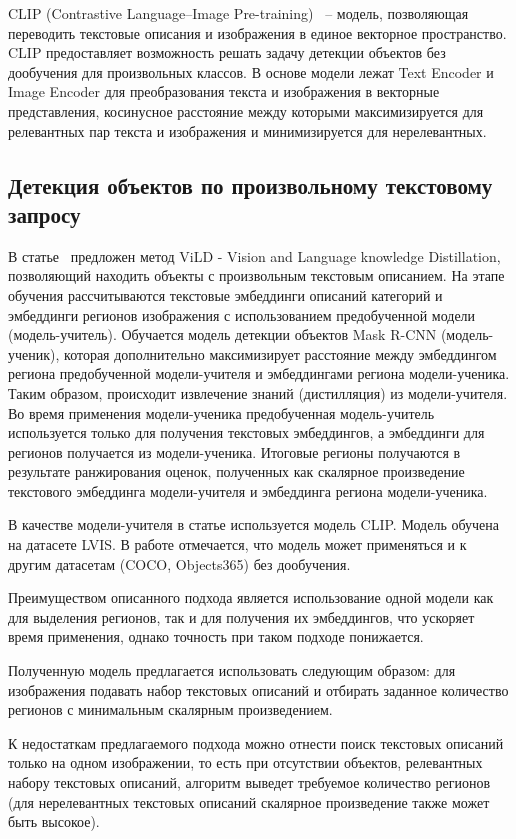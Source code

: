 \documentclass[a4paper,14pt]{article}
\begin{document}
    CLIP (Contrastive Language–Image Pre-training)~\cite{CLIP} -- модель, позволяющая переводить текстовые описания и изображения в единое векторное пространство.
    CLIP предоставляет возможность решать задачу детекции объектов без дообучения для произвольных классов.
    В основе модели лежат Text Encoder и Image Encoder для преобразования текста и изображения в векторные представления, косинусное расстояние между которыми максимизируется для релевантных пар текста и изображения и минимизируется для нерелевантных.

    \subsection{Детекция объектов по произвольному текстовому запросу}

    В статье~\cite{ViLD} предложен метод ViLD - Vision and Language knowledge Distillation, позволяющий находить объекты с произвольным текстовым описанием.
    На этапе обучения рассчитываются текстовые эмбеддинги описаний категорий и эмбеддинги регионов изображения с использованием предобученной модели (модель-учитель).
    Обучается модель детекции объектов Mask R-CNN (модель-ученик), которая дополнительно максимизирует расстояние между эмбеддингом региона предобученной модели-учителя и эмбеддингами региона модели-ученика.
    Таким образом, происходит извлечение знаний (дистилляция) из модели-учителя.
    Во время применения модели-ученика предобученная модель-учитель используется только для получения текстовых эмбеддингов, а эмбеддинги для регионов получается из модели-ученика.
    Итоговые регионы получаются в результате ранжирования оценок, полученных как скалярное произведение текстового эмбеддинга модели-учителя и эмбеддинга региона модели-ученика.

    В качестве модели-учителя в статье используется модель CLIP.
    Модель обучена на датасете LVIS. 
    В работе отмечается, что модель может применяться и к другим датасетам (COCO, Objects365) без дообучения.

    Преимуществом описанного подхода является использование одной модели как для выделения регионов, так и для получения их эмбеддингов, что ускоряет время применения, однако точность при таком подходе понижается.

    Полученную модель предлагается использовать следующим образом: для изображения подавать набор текстовых описаний и отбирать заданное количество регионов с минимальным скалярным произведением.

    К недостаткам предлагаемого подхода можно отнести поиск текстовых описаний только на одном изображении, то есть при отсутствии объектов, релевантных набору текстовых описаний, алгоритм выведет требуемое количество регионов (для нерелевантных текстовых описаний скалярное произведение также может быть высокое).
\end{document}
